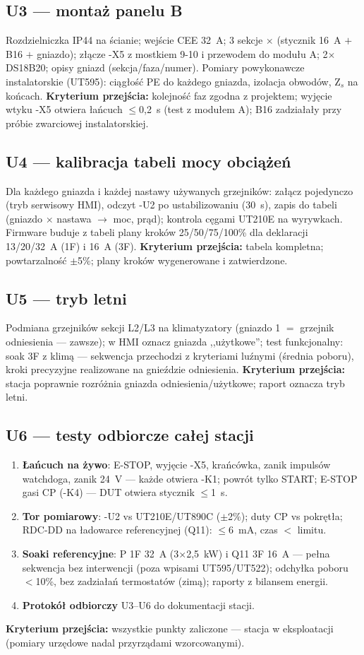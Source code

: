 \documentclass[11pt,a4paper]{article}
\newcommand{\krok}[1]{\textbf{\color{granat}Kryterium przejścia:} #1}
\begin{document}
\subsection{U3 --- montaż panelu B}
Rozdzielniczka IP44 na ścianie; wejście CEE 32~A; 3 sekcje $\times$ (stycznik 16~A $+$ B16 $+$
gniazdo); złącze -X5 z mostkiem 9-10 i przewodem do modułu A; 2$\times$DS18B20; opisy gniazd
(sekcja/faza/numer). Pomiary powykonawcze instalatorskie (UT595): ciągłość PE do każdego gniazda,
izolacja obwodów, Z$_s$ na końcach. \krok{kolejność faz zgodna z projektem; wyjęcie wtyku -X5
otwiera łańcuch $\le$0,2~s (test z modułem A); B16 zadziałały przy próbie zwarciowej instalatorskiej.}

\subsection{U4 --- kalibracja tabeli mocy obciążeń}
Dla każdego gniazda i każdej nastawy używanych grzejników: załącz pojedynczo (tryb serwisowy HMI),
odczyt -U2 po ustabilizowaniu (30~s), zapis do tabeli (gniazdo $\times$ nastawa $\to$ moc, prąd);
kontrola cęgami UT210E na wyrywkach. Firmware buduje z tabeli plany kroków 25/50/75/100\% dla
deklaracji 13/20/32~A (1F) i 16~A (3F). \krok{tabela kompletna; powtarzalność $\pm$5\%; plany
kroków wygenerowane i zatwierdzone.}

\subsection{U5 --- tryb letni}
Podmiana grzejników sekcji L2/L3 na klimatyzatory (gniazdo 1 $=$ grzejnik odniesienia ---
zawsze); w HMI oznacz gniazda ,,użytkowe''; test funkcjonalny: soak 3F z klimą --- sekwencja
przechodzi z kryteriami luźnymi (średnia poboru), kroki precyzyjne realizowane na gnieździe
odniesienia. \krok{stacja poprawnie rozróżnia gniazda odniesienia/użytkowe; raport oznacza tryb
letni.}

\subsection{U6 --- testy odbiorcze całej stacji}
\begin{enumerate}
\item \textbf{Łańcuch na żywo}: E-STOP, wyjęcie -X5, krańcówka, zanik impulsów watchdoga, zanik
24~V --- każde otwiera -K1; powrót tylko START; E-STOP gasi CP (-K4) --- DUT otwiera stycznik
$\le$1~s.
\item \textbf{Tor pomiarowy}: -U2 vs UT210E/UT890C ($\pm$2\%); duty CP vs pokrętła; RDC-DD na
ładowarce referencyjnej (Q11): $\le$6~mA, czas $<$ limitu.
\item \textbf{Soaki referencyjne}: P 1F 32~A (3$\times$2,5~kW) i Q11 3F 16~A --- pełna sekwencja
bez interwencji (poza wpisami UT595/UT522); odchyłka poboru $<$10\%, bez zadziałań termostatów
(zimą); raporty z bilansem energii.
\item \textbf{Protokół odbiorczy} U3--U6 do dokumentacji stacji.
\end{enumerate}
\krok{wszystkie punkty zaliczone --- stacja w eksploatacji (pomiary urzędowe nadal przyrządami
wzorcowanymi).}
\end{document}
